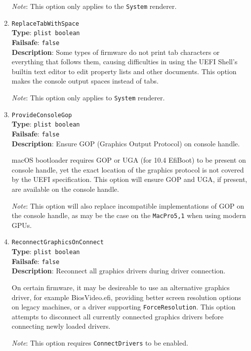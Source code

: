 \documentclass[]{article}
\begin{document}
\begin{enumerate}
  \emph{Note}: This option only applies to the \texttt{System} renderer.

\item
  \texttt{ReplaceTabWithSpace}\\
  \textbf{Type}: \texttt{plist\ boolean}\\
  \textbf{Failsafe}: \texttt{false}\\
  \textbf{Description}: Some types of firmware do not print tab characters or everything
  that follows them, causing difficulties in using the UEFI Shell's builtin
  text editor to edit property lists and other documents. This option makes the console
  output spaces instead of tabs.

  \emph{Note}: This option only applies to \texttt{System} renderer.

\item
  \texttt{ProvideConsoleGop}\\
  \textbf{Type}: \texttt{plist\ boolean}\\
  \textbf{Failsafe}: \texttt{false}\\
  \textbf{Description}: Ensure GOP (Graphics Output Protocol) on console handle.

  macOS bootloader requires GOP or UGA (for 10.4 EfiBoot) to be present on console
  handle, yet the exact location of the graphics protocol is not covered by the
  UEFI specification. This option will ensure GOP and UGA, if present, are available
  on the console handle.

  \emph{Note}: This option will also replace incompatible implementations of GOP on the
  console handle, as may be the case on the \texttt{MacPro5,1} when using modern GPUs.

\item
  \texttt{ReconnectGraphicsOnConnect}\\
  \textbf{Type}: \texttt{plist\ boolean}\\
  \textbf{Failsafe}: \texttt{false}\\
  \textbf{Description}: Reconnect all graphics drivers during driver connection.

  On certain firmware, it may be desireable to use an alternative graphics driver,
  for example BiosVideo.efi, providing better screen resolution options on legacy
  machines, or a driver supporting \texttt{ForceResolution}. This option attempts
  to disconnect all currently connected graphics drivers before connecting newly
  loaded drivers.

  \emph{Note}: This option requires \texttt{ConnectDrivers} to be enabled.


\end{enumerate}
\end{document}
